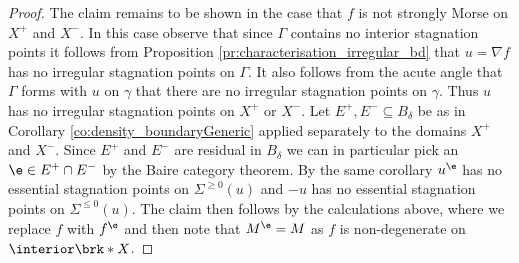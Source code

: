 \begin{proof}
  The claim remains to be shown in the case that $f$ is not strongly Morse on $X^+$ and $X^-$. In this case 
  observe that since $\Gamma$ contains no interior stagnation points it follows from Proposition \ref{pr:characterisation_irregular_bd}
  that $u=\nabla f$ has no irregular stagnation points on $\Gamma$. It also follows from the acute angle that $\Gamma$ forms with $u$ on $\gamma$ that
  there are no irregular stagnation points on $\gamma$. Thus $u$ has no irregular stagnation points on $X^+$ or $X^-$.
  Let $E^+,E^-\subseteq B_\delta$ be as in Corollary \ref{co:density_boundaryGeneric} applied separately to the domains $X^+$ and $X^-$.
  Since $E^+$ and $E^-$ are residual in $B_\delta$ we can in particular pick an $\e\in E^+\cap E^-$ by the Baire category theorem.
  By the same corollary $u^\e$ has no essential stagnation points on $\Sigma^{\geq0}(u)$
  and $-u$ has no essential stagnation points on $\Sigma^{\leq0}(u)$.
  The claim then follows by the calculations above, where we replace
  $f$ with $f^\e$ and then note that $M^\e=M$ as $f$ is non-degenerate on $\interior\brk*{X}$.
\end{proof}

